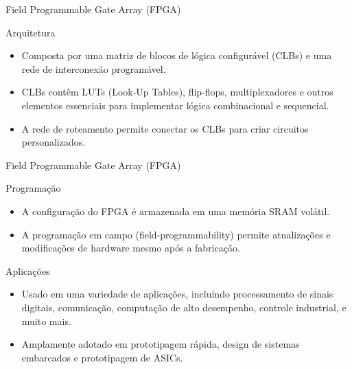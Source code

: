 \documentclass[aspectratio=169]{beamer}
\begin{document}
\begin{frame}{Field Programmable Gate Array (FPGA)}
	\justifying

	\begin{block}{Arquitetura}
		\justifying
		\begin{itemize}
			\item Composta por uma matriz de blocos de lógica configurável (CLBs) e uma rede de interconexão programável.
			\item CLBs contêm LUTs (Look-Up Tables), flip-flops, multiplexadores e outros elementos essenciais para implementar lógica combinacional e sequencial.
			\item A rede de roteamento permite conectar os CLBs para criar circuitos personalizados.
		\end{itemize}
		
	\end{block}	
	
\end{frame}

\begin{frame}{Field Programmable Gate Array (FPGA)}
	\justifying
	
	\begin{block}{Programação}
		\justifying
		\begin{itemize}
			\item A configuração do FPGA é armazenada em uma memória SRAM volátil.
			\item A programação em campo (field-programmability) permite atualizações e modificações de hardware mesmo após a fabricação.
		\end{itemize}
		
	\end{block}		
	
	
	\begin{block}{Aplicações}
		\justifying
		\begin{itemize}
			\item Usado em uma variedade de aplicações, incluindo processamento de sinais digitais, comunicação, computação de alto desempenho, controle industrial, e muito mais.
			\item Amplamente adotado em prototipagem rápida, design de sistemas embarcados e prototipagem de ASICs.
		\end{itemize}
		
	\end{block}		
	
\end{frame}
\end{document}
